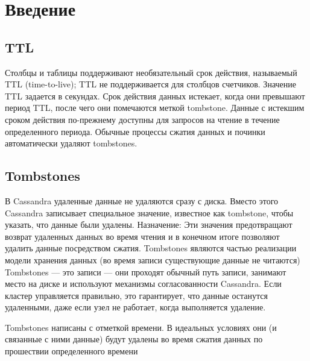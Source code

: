 \section*{\LARGE Введение}
\subsection{TTL}
Столбцы и таблицы поддерживают необязательный срок действия,
называемый TTL (time-to-live); TTL не поддерживается для столбцов счетчиков.
Значение TTL задается в секундах. Срок действия данных истекает, когда они
превышают период TTL, после чего они помечаются меткой tombstone. Данные
с истекшим сроком действия по-прежнему доступны для запросов на чтение в
течение определенного периода. Обычные процессы сжатия данных и починки
автоматически удаляют tombstones.
\subsection{Tombstones}
В Cassandra удаленные данные не удаляются сразу с диска. Вместо этого
Cassandra записывает специальное значение, известное как tombstone, чтобы
указать, что данные были удалены.
Назначение:
Эти значения предотвращают возврат удаленных данных во время чтения
и в конечном итоге позволяют удалить данные посредством сжатия.
Tombstones являются частью реализации модели хранения данных (во
время записи существующие данные не читаются)
Tombstones — это записи — они проходят обычный путь записи,
занимают место на диске и используют механизмы согласованности Cassandra.
Если кластер управляется правильно, это гарантирует, что данные останутся
удаленными, даже если узел не работает, когда выполняется удаление.

Tombstones написаны с отметкой времени. В идеальных условиях
они (и связанные с ними данные) будут удалены во время сжатия данных по
прошествии определенного времени

\clearpage
